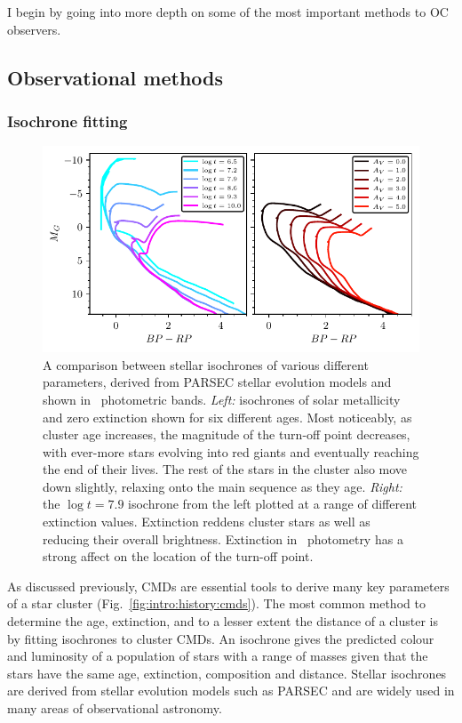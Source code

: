 I begin by going into more depth on some of the most important methods to OC observers.


\subsection{Observational methods}
\label{sec:intro:theory:observations}

\subsubsection{Isochrone fitting}

\begin{figure}[tb]
	\includegraphics[width=\textwidth]{fig/c1/isochrones.pdf}
	\caption[A comparison between stellar isochrones of various different parameters.]{A comparison between stellar isochrones of various different parameters, derived from PARSEC stellar evolution models \citep{bressan_parsec_2012} and shown in \gaia\ photometric bands. \emph{Left:} isochrones of solar metallicity and zero extinction shown for six different ages. Most noticeably, as cluster age increases, the magnitude of the turn-off point decreases, with ever-more stars evolving into red giants and eventually reaching the end of their lives. The rest of the stars in the cluster also move down slightly, relaxing onto the main sequence as they age. \emph{Right:} the $\log t = 7.9$ isochrone from the left plotted at a range of different extinction values. Extinction reddens cluster stars as well as reducing their overall brightness. Extinction in \gaia\ photometry has a strong affect on the location of the turn-off point.}
	\label{fig:intro:history:isochrones}
\end{figure}

As discussed previously, CMDs are essential tools to derive many key parameters of a star cluster (Fig.~\ref{fig:intro:history:cmds}). The most common method to determine the age, extinction, and to a lesser extent the distance of a cluster is by fitting isochrones to cluster CMDs. An isochrone gives the predicted colour and luminosity of a population of stars with a range of masses given that the stars have the same age, extinction, composition and distance. Stellar isochrones are derived from stellar evolution models such as PARSEC \citep{bressan_parsec_2012} and are widely used in many areas of observational astronomy.

